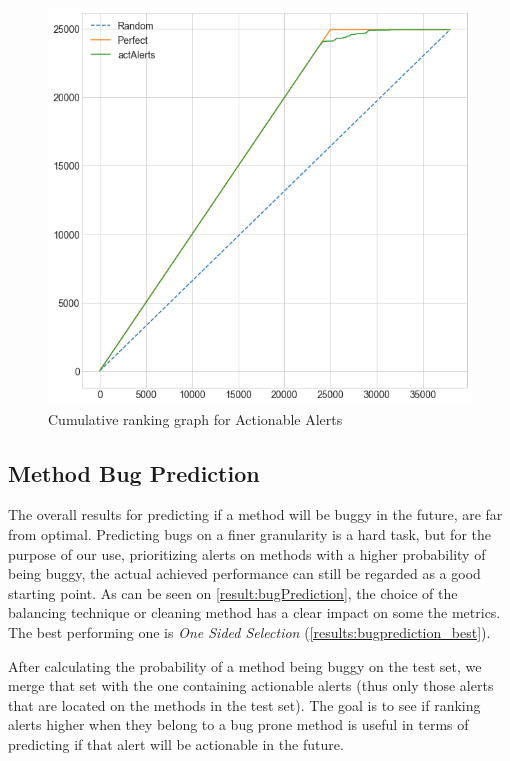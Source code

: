 \begin{figure}[H]
	\centering
	\includegraphics[scale=0.4]{./src/actAlerts/cumulative_graph_all.png}
	\caption{Cumulative ranking graph for Actionable Alerts}
	\label{results:cumulative_actalerts}
\end{figure}


\subsection{Method Bug Prediction}

The overall results for predicting if a method will be buggy in the future, are far from optimal. Predicting bugs on a finer granularity is a hard task, but for the purpose of our use, prioritizing alerts on methods with a higher probability of being buggy, the actual achieved performance can still be regarded as a good starting point.
As can be seen on \cref{result:bugPrediction}, the choice of the balancing technique or cleaning method has a clear impact on some the metrics. The best performing one is \textit{One Sided Selection} (\cref{results:bugprediction_best}). 

After calculating the probability of a method being buggy on the test set, we merge that set with the one containing actionable alerts (thus only those alerts that are located on the methods in the test set). The goal is to see if ranking alerts higher when they belong to a bug prone method is useful in terms of predicting if that alert will be actionable in the future.

